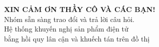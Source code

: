 \begin{frame}[plain]
\vfill
\begin{center}
{\LARGE\bfseries\color{PrimaryBlue}XIN CẢM ƠN THẦY CÔ VÀ CÁC BẠN!}\\[0.65cm]
{\large Nhóm sẵn sàng trao đổi và trả lời câu hỏi.}\\[0.32cm]
{\normalsize Hệ thống khuyến nghị sản phẩm điện tử\\
bằng hồi quy lân cận và khuếch tán trên đồ thị}
\end{center}
\vfill
\end{frame}

